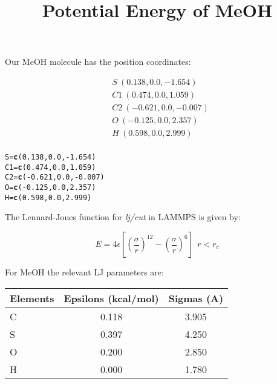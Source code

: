 \documentclass{article}\usepackage[]{graphicx}\usepackage[]{color}
\makeatletter
\newcommand{\hlnum}[1]{\textcolor[rgb]{0.686,0.059,0.569}{#1}}%
\newcommand{\hlopt}[1]{\textcolor[rgb]{0,0,0}{#1}}%
\newcommand{\hlstd}[1]{\textcolor[rgb]{0.345,0.345,0.345}{#1}}%
\newcommand{\hlkwb}[1]{\textcolor[rgb]{0.69,0.353,0.396}{#1}}%
\newcommand{\hlkwd}[1]{\textcolor[rgb]{0.737,0.353,0.396}{\textbf{#1}}}%
\newenvironment{kframe}{%
 \def\at@end@of@kframe{}%
 \ifinner\ifhmode%
  \def\at@end@of@kframe{\end{minipage}}%
  \begin{minipage}{\columnwidth}%
 \fi\fi%
 \def\FrameCommand##1{\hskip\@totalleftmargin \hskip-\fboxsep
 \colorbox{shadecolor}{##1}\hskip-\fboxsep
     \hskip-\linewidth \hskip-\@totalleftmargin \hskip\columnwidth}%
 \MakeFramed {\advance\hsize-\width
   \@totalleftmargin\z@ \linewidth\hsize
   \@setminipage}}%
 {\par\unskip\endMakeFramed%
 \at@end@of@kframe}
\newenvironment{knitrout}{}{} %
\makeatother
\begin{document}
\title{Potential Energy of MeOH}
\maketitle

Our MeOH molecule has the position coordinates:

\begin{align*}
  &S\ (0.138,0.0,-1.654)\\
  &C1\ (0.474,0.0,1.059)\\
  &C2\ (-0.621,0.0,-0.007)\\
  &O\ (-0.125,0.0,2.357)\\
  &H\ (0.598,0.0,2.999)\\
\end{align*}

\begin{knitrout}
\color{fgcolor}\begin{kframe}
\begin{alltt}
  \hlstd{S}\hlkwb{=}\hlkwd{c}\hlstd{(}\hlnum{0.138}\hlstd{,}\hlnum{0.0}\hlstd{,}\hlopt{-}\hlnum{1.654}\hlstd{)}
  \hlstd{C1}\hlkwb{=}\hlkwd{c}\hlstd{(}\hlnum{0.474}\hlstd{,}\hlnum{0.0}\hlstd{,}\hlnum{1.059}\hlstd{)}
  \hlstd{C2}\hlkwb{=}\hlkwd{c}\hlstd{(}\hlopt{-}\hlnum{0.621}\hlstd{,}\hlnum{0.0}\hlstd{,}\hlopt{-}\hlnum{0.007}\hlstd{)}
  \hlstd{O}\hlkwb{=}\hlkwd{c}\hlstd{(}\hlopt{-}\hlnum{0.125}\hlstd{,}\hlnum{0.0}\hlstd{,}\hlnum{2.357}\hlstd{)}
  \hlstd{H}\hlkwb{=}\hlkwd{c}\hlstd{(}\hlnum{0.598}\hlstd{,}\hlnum{0.0}\hlstd{,}\hlnum{2.999}\hlstd{)}
\end{alltt}
\end{kframe}
\end{knitrout}

The Lennard-Jones function for \textit{lj/cut} in LAMMPS is given by:

$$E = 4\epsilon[(\frac{\sigma}{r})^{12}-(\frac{\sigma}{r})^6]\ \ r<r_c $$

For MeOH the relevant LJ parameters are:

\begin{table}[ht]
\centering
\begin{tabular}{|l||c||c|}
  \hline
Elements & Epsilons (kcal/mol) & Sigmas (A) \\ 
  \hline
C & 0.118 & 3.905 \\ 
  S & 0.397 & 4.250 \\ 
  O & 0.200 & 2.850 \\ 
  H & 0.000 & 1.780 \\ 
   \hline
\end{tabular}
\end{table}
\end{document}
